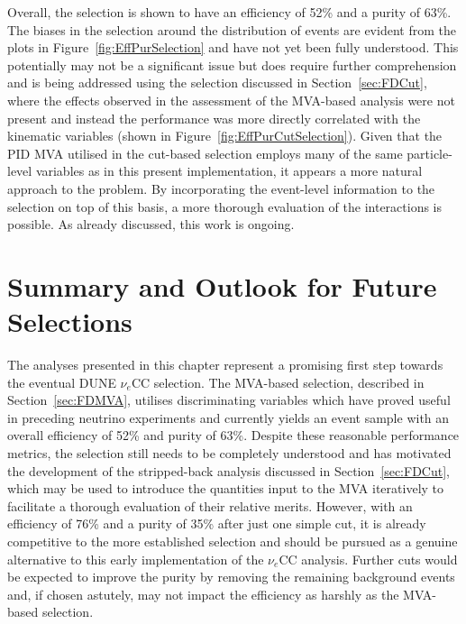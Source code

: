 Overall, the selection is shown to have an efficiency of 52\% and a purity of 63\%.  The biases in the selection around the distribution of events are evident from the plots in Figure~\ref{fig:EffPurSelection} and have not yet been fully understood.  This potentially may not be a significant issue but does require further comprehension and is being addressed using the selection discussed in Section~\ref{sec:FDCut}, where the effects observed in the assessment of the MVA-based analysis were not present and instead the performance was more directly correlated with the kinematic variables (shown in Figure~\ref{fig:EffPurCutSelection}).  Given that the PID MVA utilised in the cut-based selection employs many of the same particle-level variables as in this present implementation, it appears a more natural approach to the problem.  By incorporating the event-level information to the selection on top of this basis, a more thorough evaluation of the interactions is possible.  As already discussed, this work is ongoing.

\section{Summary and Outlook for Future Selections}\label{sec:FDOutlook}

The analyses presented in this chapter represent a promising first step towards the eventual DUNE $\nu_e$CC selection.  The MVA-based selection, described in Section~\ref{sec:FDMVA}, utilises discriminating variables which have proved useful in preceding neutrino experiments and currently yields an event sample with an overall efficiency of 52\% and purity of 63\%.  Despite these reasonable performance metrics, the selection still needs to be completely understood and has motivated the development of the stripped-back analysis discussed in Section~\ref{sec:FDCut}, which may be used to introduce the quantities input to the MVA iteratively to facilitate a thorough evaluation of their relative merits.  However, with an efficiency of 76\% and a purity of 35\% after just one simple cut, it is already competitive to the more established selection and should be pursued as a genuine alternative to this early implementation of the $\nu_e$CC analysis.  Further cuts would be expected to improve the purity by removing the remaining background events and, if chosen astutely, may not impact the efficiency as harshly as the MVA-based selection.

